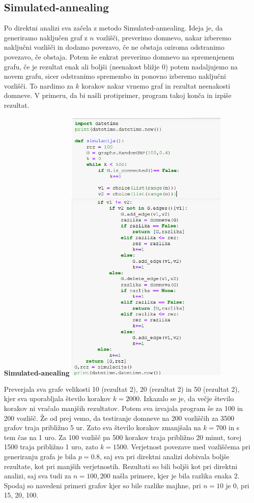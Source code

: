 \documentclass[10pt, a4paper]{article}
\begin{document}
\subsection{Simulated-annealing}
Po direktni analizi sva začela z metodo Simulated-annealing. Ideja je, da generiramo naključen graf z $n$ vozlišči, preverimo domnevo, nakar izberemo naključni vozlišči in dodamo povezavo, če ne obstaja oziroma odstranimo povezavo, če obstaja. Potem še enkrat preverimo domnevo na spremenjenem grafu, če je rezultat enak ali boljši (neenakost bližje 0) potem nadaljujemo na novem grafu, sicer odstranimo spremembo in ponovno izberemo naključni vozlišči. To nardimo za $k$ korakov nakar vrnemo graf in rezultat neenakosti domneve. V primeru, da bi našli protiprimer, program takoj konča in izpiše rezultat.

\begin{center}
\textbf{Simulated-anealing}
\includegraphics[width=8cm]{Simulacija}
\end{center}

Preverjala sva grafe velikosti 10 (rezultat 2), 20 (rezultat 2) in 50 (rezultat 2), kjer sva uporabljala število korakov $k=2000$. Izkazalo se je, da večje število korakov ni vračalo manjših rezultatov. Potem sva izvajala program še za 100 in 200 vozlišč. Že od prej vemo, da testiranje domneve na 200 vozliščih za 3500 grafov traja približno 5 ur. Zato sva število korakov zmanjšala na $k=700$ in s tem čas na 1 uro. Za 100 vozlišč pa 500 korakov traja približno 20 minut, torej 1500 traja približno 1 uro, zato $k=1500$. Verjetnost povezave med vozliščema pri generiranju grafa je bila $p=0.8$, saj sva pri direktni analizi dobivala boljše rezultate, kot pri manjših verjetnostih. Rezultati so bili boljši kot pri direktni analizi, saj sva tudi za $n=100,200$ našla primere, kjer je bila razlika enaka 2. Spodaj so navedeni primeri grafov kjer so bile razlike majhne, pri $n=10$ je 0, pri 15, 20, 100.  
\end{document}
